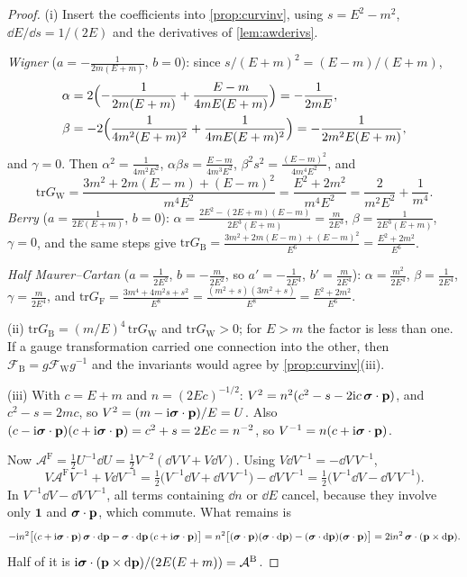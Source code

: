 \begin{proof}
(i) Insert the coefficients into \cref{prop:curvinv}, using $s=E^2-m^2$, $\dd E/\dd s=1/(2E)$ and the derivatives of \cref{lem:awderivs}.

\emph{Wigner} ($a=-\frac1{2m(E+m)}$, $b=0$): since $s/(E+m)^2=(E-m)/(E+m)$,
\[
\begin{aligned}
\alpha&=2\Bigl(-\frac1{2m(E+m)}+\frac{E-m}{4mE(E+m)}\Bigr)=-\frac1{2mE},\\
\beta&=-2\Bigl(\frac1{4m^2(E+m)^2}+\frac1{4mE(E+m)^2}\Bigr)=-\frac1{2m^2E(E+m)},
\end{aligned}
\]
and $\gamma=0$. Then $\alpha^2=\frac1{4m^2E^2}$, $\alpha\beta s=\frac{E-m}{4m^3E^2}$, $\beta^2s^2=\frac{(E-m)^2}{4m^4E^2}$, and
\[
\mathrm{tr}G_{\mathrm W}=\frac{3m^2+2m(E-m)+(E-m)^2}{m^4E^2}=\frac{E^2+2m^2}{m^4E^2}=\frac2{m^2E^2}+\frac1{m^4}.
\]
\emph{Berry} ($a=\frac1{2E(E+m)}$, $b=0$): $\alpha=\frac{2E^2-(2E+m)(E-m)}{2E^3(E+m)}=\frac m{2E^3}$, $\beta=\frac1{2E^3(E+m)}$, $\gamma=0$, and the same steps give $\mathrm{tr}G_{\mathrm B}=\frac{3m^2+2m(E-m)+(E-m)^2}{E^6}=\frac{E^2+2m^2}{E^6}$.

\emph{Half Maurer--Cartan} ($a=\frac1{2E^2}$, $b=-\frac m{2E^2}$, so $a'=-\frac1{2E^4}$, $b'=\frac m{2E^4}$): $\alpha=\frac{m^2}{2E^4}$, $\beta=\frac1{2E^4}$, $\gamma=\frac m{2E^4}$, and $\mathrm{tr}G_{\mathrm F}=\frac{3m^4+4m^2s+s^2}{E^8}=\frac{(m^2+s)(3m^2+s)}{E^8}=\frac{E^2+2m^2}{E^6}$.

(ii) $\mathrm{tr}G_{\mathrm B}=(m/E)^4\,\mathrm{tr}G_{\mathrm W}$ and $\mathrm{tr}G_{\mathrm W}>0$; for $E>m$ the factor is less than one. If a gauge transformation carried one connection into the other, then $\mathcal F_{\mathrm B}=g\mathcal F_{\mathrm W}g^{-1}$ and the invariants would agree by \cref{prop:curvinv}(iii).

(iii) With $c=E+m$ and $n=(2Ec)^{-1/2}$: $V^2=n^2(c^2-s-2\mathrm{i} c\,\boldsymbol{\sigma}\cdot\mathbf p)$, and $c^2-s=2mc$, so $V^2=(m-\mathrm{i}\boldsymbol{\sigma}\cdot\mathbf p)/E=U$. Also $(c-\mathrm{i}\boldsymbol{\sigma}\cdot\mathbf p)(c+\mathrm{i}\boldsymbol{\sigma}\cdot\mathbf p)=c^2+s=2Ec=n^{-2}$, so $V^{-1}=n(c+\mathrm{i}\boldsymbol{\sigma}\cdot\mathbf p)$.

Now $\mathcal A^{\mathrm F}=\frac12U^{-1}\dd U=\frac12V^{-2}(\dd V\,V+V\dd V)$. Using $V\dd V^{-1}=-\dd V\,V^{-1}$,
\[
V\mathcal A^{\mathrm F}V^{-1}+V\dd V^{-1}=\tfrac12\bigl(V^{-1}\dd V+\dd V\,V^{-1}\bigr)-\dd V\,V^{-1}=\tfrac12\bigl(V^{-1}\dd V-\dd V\,V^{-1}\bigr).
\]
In $V^{-1}\dd V-\dd V\,V^{-1}$, all terms containing $\dd n$ or $\dd E$ cancel, because they involve only $\mathbf 1$ and $\boldsymbol{\sigma}\cdot\mathbf p$, which commute. What remains is
\[
-\mathrm{i} n^2\bigl[(c+\mathrm{i}\boldsymbol{\sigma}\cdot\mathbf p)\,\boldsymbol{\sigma}\cdot\mathrm{d}\mathbf p-\boldsymbol{\sigma}\cdot\mathrm{d}\mathbf p\,(c+\mathrm{i}\boldsymbol{\sigma}\cdot\mathbf p)\bigr]=n^2\bigl[(\boldsymbol{\sigma}\cdot\mathbf p)(\boldsymbol{\sigma}\cdot\mathrm{d}\mathbf p)-(\boldsymbol{\sigma}\cdot\mathrm{d}\mathbf p)(\boldsymbol{\sigma}\cdot\mathbf p)\bigr]=2\mathrm{i} n^2\,\boldsymbol{\sigma}\cdot(\mathbf p\times\mathrm{d}\mathbf p).
\]
Half of it is $\mathrm{i}\boldsymbol{\sigma}\cdot(\mathbf p\times\mathrm{d}\mathbf p)/(2E(E+m))=\mathcal A^{\mathrm B}$.
\end{proof}


